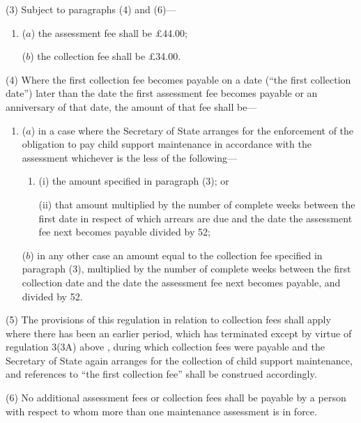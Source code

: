 \documentclass[a4paper]{article}
\begin{document}
(3) Subject to paragraphs (4) and (6)—
\begin{enumerate}\item[]
($a$) the assessment fee shall be £44.00;

($b$) the collection fee shall be £34.00.
\end{enumerate}

(4) Where the first collection fee becomes payable on a date (“the first collection date”) later than the date the first assessment fee becomes payable or an anniversary of that date, 
the amount of that fee shall be—
\begin{enumerate}\item[]
($a$) in a case where the Secretary of State arranges for the enforcement of the obligation to pay child support maintenance in accordance with the assessment whichever is the less of the following—
\begin{enumerate}\item[]
(i) the amount specified in paragraph (3); or

(ii) that amount multiplied by the number of complete weeks between the first date in respect of which arrears are due and the date the assessment fee next becomes payable divided by 52;
\end{enumerate}

($b$) in any other case an amount equal to the collection fee specified in paragraph (3), multiplied by the number of complete weeks between the first collection date and the date the assessment fee next becomes payable, and divided by 52.
\end{enumerate}  %

(5) The provisions of this regulation in relation to collection fees shall apply where there has been an earlier period, which has terminated
except by virtue of regulation 3(3A) above%
, during which collection fees were payable and the Secretary of State again arranges for the collection of child support maintenance, and references to “the first collection fee” shall be construed accordingly.

(6) No additional assessment fees or collection fees shall be payable by a person with respect to whom more than one maintenance assessment is in force.
\end{document}
